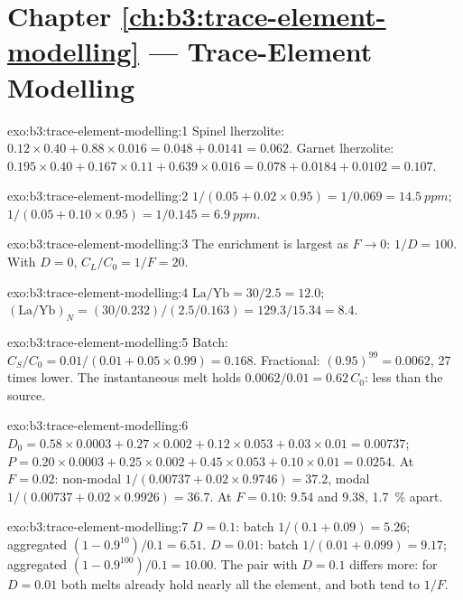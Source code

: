 \section*{Chapter \ref{ch:b3:trace-element-modelling} --- Trace-Element Modelling}

\begin{solution}{exo:b3:trace-element-modelling:1}
Spinel lherzolite: $0.12\times0.40 + 0.88\times0.016 = 0.048 + 0.0141 =
0.062$. Garnet lherzolite: $0.195\times0.40 + 0.167\times0.11 +
0.639\times0.016 = 0.078 + 0.0184 + 0.0102 = 0.107$.
\end{solution}

\begin{solution}{exo:b3:trace-element-modelling:2}
$1/(0.05 + 0.02\times0.95) = 1/0.069 = \qty{14.5}{ppm}$;
$1/(0.05 + 0.10\times0.95) = 1/0.145 = \qty{6.9}{ppm}$.
\end{solution}

\begin{solution}{exo:b3:trace-element-modelling:3}
The enrichment is largest as $F \to 0$: $1/D = 100$. With $D = 0$,
$C_L/C_0 = 1/F = 20$.
\end{solution}

\begin{solution}{exo:b3:trace-element-modelling:4}
$\mathrm{La/Yb} = 30/2.5 = 12.0$; $(\mathrm{La}/\mathrm{Yb})_N =
(30/0.232)/(2.5/0.163) = 129.3/15.34 = 8.4$.
\end{solution}

\begin{solution}{exo:b3:trace-element-modelling:5}
Batch: $C_S/C_0 = 0.01/(0.01 + 0.05\times0.99) = 0.168$. Fractional:
$(0.95)^{99} = 0.0062$, 27 times lower. The instantaneous melt holds
$0.0062/0.01 = 0.62\,C_0$: less than the source.
\end{solution}

\begin{solution}{exo:b3:trace-element-modelling:6}
$D_0 = 0.58\times0.0003 + 0.27\times0.002 + 0.12\times0.053 + 0.03\times0.01
= 0.00737$; $P = 0.20\times0.0003 + 0.25\times0.002 + 0.45\times0.053 +
0.10\times0.01 = 0.0254$. At $F = 0.02$: non-modal $1/(0.00737 +
0.02\times0.9746) = 37.2$, modal $1/(0.00737 + 0.02\times0.9926) = 36.7$. At
$F = 0.10$: 9.54 and 9.38, \qty{1.7}{\percent} apart.
\end{solution}

\begin{solution}{exo:b3:trace-element-modelling:7}
$D = 0.1$: batch $1/(0.1 + 0.09) = 5.26$; aggregated $(1 - 0.9^{10})/0.1 =
6.51$. $D = 0.01$: batch $1/(0.01 + 0.099) = 9.17$; aggregated
$(1 - 0.9^{100})/0.1 = 10.00$. The pair with $D = 0.1$ differs more: for
$D = 0.01$ both melts already hold nearly all the element, and both tend to
$1/F$.
\end{solution}

